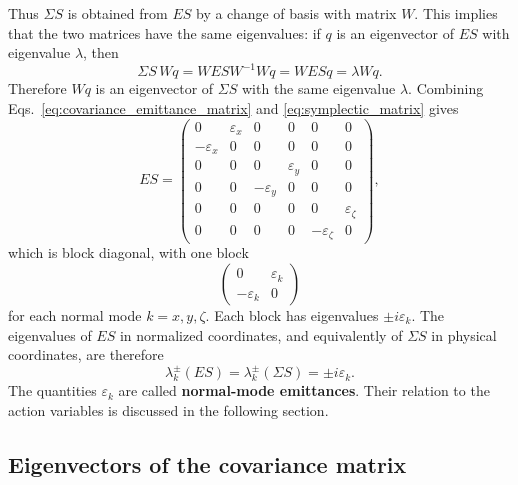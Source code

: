 Thus $\Sigma S$ is obtained from $ES$ by a change of basis with matrix $W$.
This implies that the two matrices have the same eigenvalues: if $q$ is an
eigenvector of $ES$ with eigenvalue $\lambda$, then
\begin{equation}
\Sigma S\, Wq = W E S W^{-1} Wq = W E S q = \lambda Wq.
\end{equation}
Therefore $Wq$ is an eigenvector of $\Sigma S$ with the same eigenvalue
$\lambda$. Combining Eqs.~\ref{eq:covariance_emittance_matrix} and
\ref{eq:symplectic_matrix} gives
\begin{equation}
E S =
\left(\begin{array}{cccccc}
0 & \varepsilon_x & 0 & 0 & 0 & 0\\
-\varepsilon_x & 0 & 0 & 0 & 0 & 0\\
0 & 0 & 0 & \varepsilon_y & 0 & 0\\
0 & 0 & -\varepsilon_y & 0 & 0 & 0\\
0 & 0 & 0 & 0 & 0 & \varepsilon_\zeta\\
0 & 0 & 0 & 0 & -\varepsilon_\zeta & 0
\end{array}\right),
\end{equation}
which is block diagonal, with one block
\begin{equation}
\left(\begin{array}{cc}
0 & \varepsilon_k\\
-\varepsilon_k & 0
\end{array}\right)
\end{equation}
for each normal mode $k=x,y,\zeta$. Each block has eigenvalues
$\pm i\varepsilon_k$. The eigenvalues of $ES$ in normalized coordinates, and
equivalently of $\Sigma S$ in physical coordinates, are therefore
\begin{equation}
\lambda_k^\pm(ES) = \lambda_k^\pm(\Sigma S) = \pm i \varepsilon_k.
\label{eq:emittance_from_sigma_s}
\end{equation}
The quantities $\varepsilon_k$ are called \textbf{normal-mode emittances}.
Their relation to the action variables is discussed in the following section.

\subsection{Eigenvectors of the covariance matrix}
\label{opt:sec:covariance_eigenvectors}

